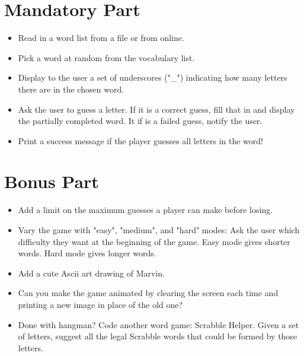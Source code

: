 \documentclass{42-en}
\begin{document}

\chapter{Mandatory Part}

\begin{itemize}

\item Read in a word list from a file or from online.
\item Pick a word at random from the vocabulary list.
\item Display to the user a set of underscores ("\_") indicating how many letters there are in the chosen word.
\item Ask the user to guess a letter. If it is a correct guess, fill that in and display the partially completed word. It if is a failed guess, notify the user.
\item Print a success message if the player guesses all letters in the word!

\end{itemize}


\chapter{Bonus Part}

\begin{itemize}

\item Add a limit on the maximum guesses a player can make before losing.
\item Vary the game with "easy", "medium", and "hard" modes: Ask the user which difficulty they want at the beginning of the game. Easy mode gives shorter words. Hard mode gives longer words. 
\item Add a cute Ascii art drawing of Marvin.
\item Can you make the game animated by clearing the screen each time and printing a new image in place of the old one?
\item Done with hangman? Code another word game: Scrabble Helper. Given a set of letters, suggest all the legal Scrabble words that could be formed by those letters.

\end{itemize}
\end{document}
